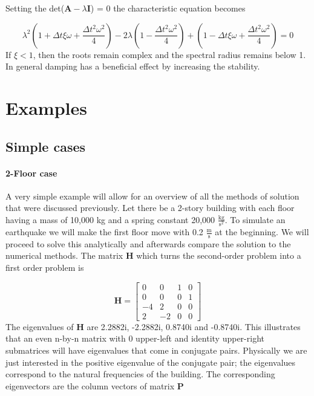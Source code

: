 \documentclass{article}
\begin{document}
Setting the det($\textbf{A}-\lambda \textbf{I}$) = 0 the characteristic equation becomes

				\begin{equation*}
					\lambda^2\left( 1 + \Delta t \xi \omega + \frac{\Delta t^2 \omega^2}{4}\right) - 2\lambda\left( 1 - \frac{\Delta t^2 \omega^2}{4} \right) + \left(1 - \Delta t \xi \omega + \frac{\Delta t^2 \omega^2}{4}\right)  = 0
				\end{equation*}
If $\xi<1$, then the roots remain complex and the spectral radius remains below 1. In general damping has a beneficial effect by increasing the stability.



	
\section{Examples}

	\subsection{Simple cases}

				\paragraph{2-Floor case} A very simple example will allow for an overview of all the methods of solution that were discussed previously. Let there be a 2-story building with each floor having a mass of 10,000 kg and a spring constant 20,000 $\frac{\text{kg}}{\text{s}^2}$. To simulate an earthquake we will make the first floor move with 0.2 $\frac{\text{m}}{\text{s}}$ at the beginning. We will proceed to solve this analytically and afterwards compare the solution to the numerical methods. 
\newline
\newline
The matrix $\textbf{H}$ which turns the second-order problem into a first order problem is 

				\begin{equation*}
					\textbf{H} = \begin{bmatrix}0&0&1&0\\0&0&0&1\\-4&2&0&0\\2&-2&0&0\end{bmatrix}
				\end{equation*}
The eigenvalues of $\textbf{H}$  are 2.2882i, -2.2882i, 0.8740i and -0.8740i. This illustrates that an even n-by-n matrix with 0 upper-left and identity upper-right submatrices will have eigenvalues that come in conjugate pairs. Physically we are just interested in the positive eigenvalue of the conjugate pair; the eigenvalues correspond to the natural frequencies of the building. The corresponding eigenvectors are the column vectors of matrix $\textbf{P}$
\end{document}
